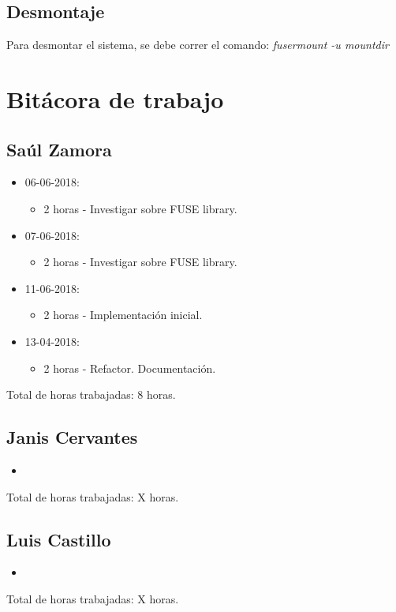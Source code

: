 \documentclass{article}
\begin{document}
\subsection{Desmontaje}
Para desmontar el sistema, se debe correr el comando: \emph{fusermount -u mountdir}
\section{Bit\'acora de trabajo}
\subsection{Sa\'ul Zamora}
\begin{itemize}
  \item 06-06-2018:
  \begin{itemize}
    \item 2 horas - Investigar sobre FUSE library.
  \end{itemize}
  \item 07-06-2018:
  \begin{itemize}
    \item 2 horas - Investigar sobre FUSE library.
  \end{itemize}
  \item 11-06-2018:
  \begin{itemize}
    \item 2 horas - Implementaci\'on inicial.
  \end{itemize}
  \item 13-04-2018:
  \begin{itemize}
    \item 2 horas - Refactor. Documentaci\'on.
  \end{itemize}
\end{itemize}
Total de horas trabajadas: 8 horas.

\subsection{Janis Cervantes}
\begin{itemize}
  \item
\end{itemize}
Total de horas trabajadas: X horas.

\subsection{Luis Castillo}
\begin{itemize}
  \item
\end{itemize}
Total de horas trabajadas: X horas.
\end{document}

